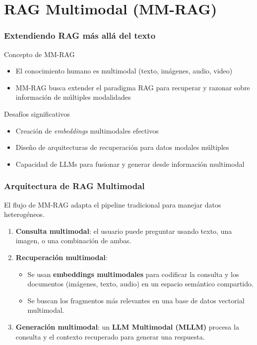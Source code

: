 \documentclass[handout]{beamer}
\begin{document}
\section{RAG Multimodal (MM-RAG)}
\begin{frame}
  \frametitle{Extendiendo RAG más allá del texto}
    \begin{block}{Concepto de MM-RAG}
        \begin{itemize}
            \item El conocimiento humano es multimodal (texto, imágenes, audio, video)
            \item MM-RAG busca extender el paradigma RAG para recuperar y razonar sobre información de múltiples modalidades
        \end{itemize}
    \end{block}
    \begin{alertblock}{Desafíos significativos}
        \begin{itemize}
            \item Creación de \textit{embeddings} multimodales efectivos
            \item Diseño de arquitecturas de recuperación para datos modales múltiples
            \item Capacidad de LLMs para fusionar y generar desde información multimodal
        \end{itemize}
    \end{alertblock}
\end{frame}

\begin{frame}
\frametitle{Arquitectura de RAG Multimodal}
El flujo de MM-RAG adapta el pipeline tradicional para manejar datos heterogéneos.

\begin{enumerate}
    \item \textbf{Consulta multimodal}: el usuario puede preguntar usando texto, una imagen, o una combinación de ambas.
    \item \textbf{Recuperación multimodal}:
    \begin{itemize}
        \item Se usan \textbf{embeddings multimodales} para codificar la consulta y los documentos (imágenes, texto, audio) en un espacio semántico compartido.
        \item Se buscan los fragmentos más relevantes en una base de datos vectorial multimodal.
    \end{itemize}
    \item \textbf{Generación multimodal}: un \textbf{LLM Multimodal (MLLM)} procesa la consulta y el contexto recuperado para generar una respuesta.
\end{enumerate}
\end{frame}
\end{document}
